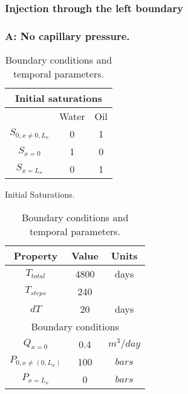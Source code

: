 \documentclass[12pt]{article}
\begin{document}
\subsubsection{Injection through the left boundary}
\subsubsection*{A: No capillary pressure.}

\begin{table}[!ht]
\begin{minipage}{.4\textwidth}
\centering
\begin{tabular}{ |c|c|c|} 
\hline
\multicolumn{3}{|c|}{Initial saturations}\\
\hline
&Water&Oil\\
\hline
$S_{0,x\neq 0, L_x}$&0&1\\
$S_{x=0}$&1&0\\
$S_{x=L_x}$&0&1\\
\hline
\end{tabular}
\caption{Initial Saturations.}\label{table:sat}
\end{minipage}%
\hspace{1cm}
\begin{minipage}{.4\textwidth}
\centering
\begin{tabular}{ |c|c|c|} 
\hline
Property&Value&Units\\
\hline
    $T_{total}$&     4800& days\\
    $T_{steps}$& 240&\\
$dT$& 20&days\\
\hline
\multicolumn{3}{|c|}{Boundary conditions}\\
\hline
$Q_{x=0}$&0.4&$m^3/day$\\
$P_{0,x\neq (0, L_x)}$&100&$bars$\\
$P_{x=L_x}$&0&$bars$\\
\hline
\end{tabular}\caption{Boundary conditions and temporal parameters.}
\label{table:ic}
\end{minipage}
\end{table} 
\end{document}
